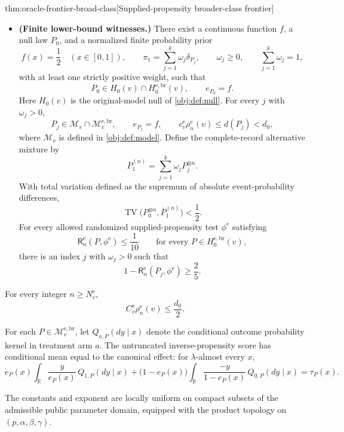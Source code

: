 \begin{theoremv}{thm:oracle-frontier-broad-class}[Supplied-propensity broader-class frontier]
\begin{itemize}
\item \textbf{(Finite lower-bound witnesses.)}
There exist a continuous function \(f\), a null law \(P_0\), and a normalized finite probability prior
\[
f(x)=\frac12\quad(x\in[0,1]),\qquad
\pi_1=\sum_{j=1}^{k}\omega_j\delta_{P_j},\qquad
\omega_j\ge0,\qquad
\sum_{j=1}^{k}\omega_j=1,
\]
with at least one strictly positive weight, such that
\[
P_0\in H_0(v)\cap H_0^{\mathrm{e,br}}(v),
\qquad e_{P_0}=f.
\]
Here \(H_0(v)\) is the original-model null of \cref{obj:def:null}.
For every \(j\) with \(\omega_j>0\),
\[
P_j\in\mathcal M_v\cap\mathcal M_v^{\mathrm{e,br}},
\qquad e_{P_j}=f,\qquad
c_v^{\mathrm e}\rho_n^{\mathrm e}(v)\le d(P_j)<d_0,
\]
where \(\mathcal M_v\) is defined in \cref{obj:def:model}.
Define the complete-record alternative mixture by
\[
\overline P_1^{(n)}
=\sum_{j=1}^{k}\omega_j P_j^{\otimes n}.
\]
With total variation defined as the supremum of absolute event-probability differences,
\[
\operatorname{TV}
\bigl(P_0^{\otimes n},\overline P_1^{(n)}\bigr)<\frac12.
\]
For every allowed randomized supplied-propensity test \(\phi^{\mathrm e}\) satisfying
\[
\mathsf R_n^{\mathrm e}(P,\phi^{\mathrm e})\le\frac1{10}
\qquad
\text{for every }P\in H_0^{\mathrm{e,br}}(v),
\]
there is an index \(j\) with \(\omega_j>0\) such that
\[
1-\mathsf R_n^{\mathrm e}(P_j,\phi^{\mathrm e})
\ge\frac25.
\]
\end{itemize}

For every integer \(n\ge N_v^{\mathrm e}\),
\[
C_v^{\mathrm e}\rho_n^{\mathrm e}(v)\le\frac{d_0}{2}.
\]

For each \(P\in\mathcal M_v^{\mathrm{e,br}}\), let
\(Q_{a,P}(dy\mid x)\) denote the conditional outcome probability kernel in treatment arm \(a\). The untruncated inverse-propensity score has conditional mean equal to the canonical effect: for \(\lambda\)-almost every \(x\),
\[
e_P(x)\int_{\mathbb R}\frac{y}{e_P(x)}\,Q_{1,P}(dy\mid x)
+
\bigl(1-e_P(x)\bigr)
\int_{\mathbb R}\frac{-y}{1-e_P(x)}\,Q_{0,P}(dy\mid x)
=\tau_P(x).
\]

The constants and exponent are locally uniform on compact subsets of the admissible public parameter domain, equipped with the product topology on \((p,\alpha,\beta,\gamma)\).
\end{theoremv}

